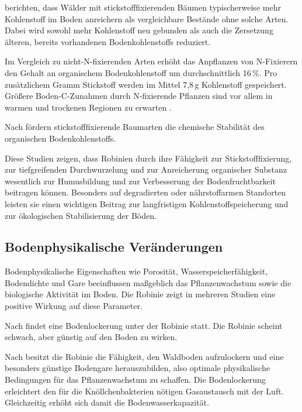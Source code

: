 \documentclass[twocolumn]{scrartcl}
\begin{document}
\citet{resh2002nFixUndC} berichten, dass Wälder mit stickstofffixierenden Bäumen typischerweise mehr Kohlenstoff im Boden anreichern als vergleichbare Bestände ohne solche Arten. Dabei wird sowohl mehr Kohlenstoff neu gebunden als auch die Zersetzung älteren, bereits vorhandenen Bodenkohlenstoffs reduziert.

Im Vergleich zu nicht-N-fixierenden Arten erhöht das Anpflanzen von N-Fixierern den Gehalt an organischem Bodenkohlenstoff um durchschnittlich 16\,\%. Pro zusätzlichem Gramm Stickstoff werden im Mittel 7{,}8\,g Kohlenstoff gespeichert. Größere Boden-C-Zunahmen durch N-fixierende Pflanzen sind vor allem in warmen und trockenen Regionen zu erwarten \citep{sun2025nFixiUndC}.

Nach \citet{ye2024nFixCstab} fördern stickstofffixierende Baumarten die chemische Stabilität des organischen Bodenkohlenstoffs.

Diese Studien zeigen, dass Robinien durch ihre Fähigkeit zur Stickstofffixierung, zur tiefgreifenden Durchwurzelung und zur Anreicherung organischer Substanz wesentlich zur Humusbildung und zur Verbesserung der Bodenfruchtbarkeit beitragen können. Besonders auf degradierten oder nährstoffarmen Standorten leisten sie einen wichtigen Beitrag zur langfristigen Kohlenstoffspeicherung und zur ökologischen Stabilisierung der Böden.


\subsection{Bodenphysikalische Veränderungen}

Bodenphysikalische Eigenschaften wie Porosität, Wasserspeicherfähigkeit, Bodendichte und Gare beeinflussen maßgeblich das Pflanzenwachstum sowie die biologische Aktivität im Boden. Die Robinie zeigt in mehreren Studien eine positive Wirkung auf diese Parameter.

Nach \citet[S.~474, 483]{ramann1898influssBodendeckeAufPhysikalischeBodeneigenschaften} findet eine Bodenlockerung unter der Robinie statt. Die Robinie scheint schwach, aber günstig auf den Boden zu wirken.

Nach \citet{albert1926robinieBodenlockerheit,penschuck1931robinieBodenphysik} besitzt die Robinie die Fähigkeit, den Waldboden aufzulockern und eine besonders günstige Bodengare herauszubilden, also optimale physikalische Bedingungen für das Pflanzenwachstum zu schaffen. Die Bodenlockerung erleichtert den für die Knöllchenbakterien nötigen Gasaustausch mit der Luft. Gleichzeitig erhöht sich damit die Bodenwasserkapazität.
\end{document}
